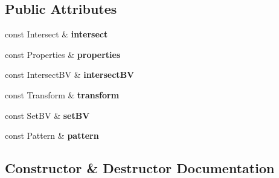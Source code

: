 \subsection*{Public Attributes}
\begin{DoxyCompactItemize}
\item 
const Intersect \& {\bfseries intersect}\hypertarget{struct_polymorphic_a0a48c3daa576070fa28115650c94eb07}{}\label{struct_polymorphic_a0a48c3daa576070fa28115650c94eb07}

\item 
const Properties \& {\bfseries properties}\hypertarget{struct_polymorphic_aeeb42d16e0d67505315ad7276c6429f4}{}\label{struct_polymorphic_aeeb42d16e0d67505315ad7276c6429f4}

\item 
const Intersect\+BV \& {\bfseries intersect\+BV}\hypertarget{struct_polymorphic_abb8b7cea1aff1faf5ee5d8c12add9629}{}\label{struct_polymorphic_abb8b7cea1aff1faf5ee5d8c12add9629}

\item 
const Transform \& {\bfseries transform}\hypertarget{struct_polymorphic_aa65209b0cc228ca9906655213386465e}{}\label{struct_polymorphic_aa65209b0cc228ca9906655213386465e}

\item 
const Set\+BV \& {\bfseries set\+BV}\hypertarget{struct_polymorphic_abb90a027d89d8145505fd2bd4132c4c5}{}\label{struct_polymorphic_abb90a027d89d8145505fd2bd4132c4c5}

\item 
const Pattern \& {\bfseries pattern}\hypertarget{struct_polymorphic_a8c48c99167a859e28daca1aaf5eb16c6}{}\label{struct_polymorphic_a8c48c99167a859e28daca1aaf5eb16c6}

\end{DoxyCompactItemize}


\subsection{Constructor \& Destructor Documentation}
